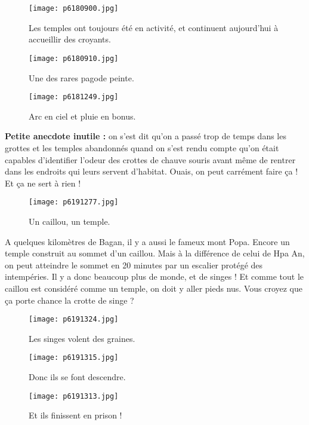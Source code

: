 \documentclass{book}
\begin{document}
\begin{figure}[h]
\centering
\texttt{[image: p6180900.jpg]}
\caption*{Les temples ont toujours été en activité, et continuent aujourd'hui à accueillir des croyants.}
\end{figure}


\begin{figure}[h]
\centering
\texttt{[image: p6180910.jpg]}
\caption*{Une des rares pagode peinte.}
\end{figure}


\begin{figure}[h]
\centering
\texttt{[image: p6181249.jpg]}
\caption*{Arc en ciel et pluie en bonus.}
\end{figure}

\textbf{Petite anecdote inutile :} on s'est dit qu'on a passé trop de temps dans les grottes et les temples abandonnés quand on s'est rendu compte qu'on était capables d'identifier l'odeur des crottes de chauve souris avant même de rentrer dans les endroits qui leurs servent d'habitat. Ouais, on peut carrément faire ça ! Et ça ne sert à rien !


\begin{figure}[h]
\centering
\texttt{[image: p6191277.jpg]}
\caption*{Un caillou, un temple.}
\end{figure}

A quelques kilomètres de Bagan, il y a aussi le fameux mont Popa. Encore un temple construit au sommet d'un caillou. Mais à la différence de celui de Hpa An, on peut atteindre le sommet en 20 minutes par un escalier protégé des intempéries. Il y a donc beaucoup plus de monde, et de singes ! Et comme tout le caillou est considéré comme un temple, on doit y aller pieds nus. Vous croyez que ça porte chance la crotte de singe ?


\begin{figure}[h]
\centering
\texttt{[image: p6191324.jpg]}
\caption*{Les singes volent des graines.}
\end{figure}


\begin{figure}[h]
\centering
\texttt{[image: p6191315.jpg]}
\caption*{Donc ils se font descendre.}
\end{figure}


\begin{figure}[h]
\centering
\texttt{[image: p6191313.jpg]}
\caption*{Et ils finissent en prison !}
\end{figure}
\end{document}
